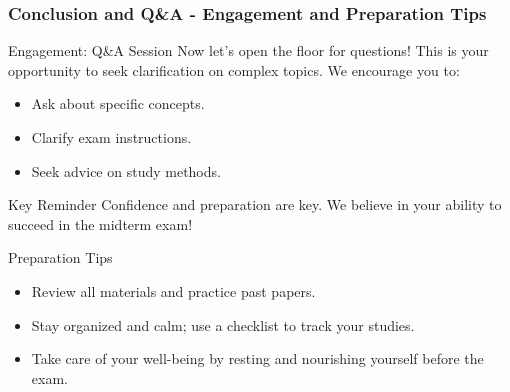 \documentclass{beamer}
\begin{document}
\begin{frame}[fragile]
    \frametitle{Conclusion and Q\&A - Engagement and Preparation Tips}
    \begin{block}{Engagement: Q\&A Session}
        Now let’s open the floor for questions! This is your opportunity to seek clarification on complex topics. We encourage you to:
        \begin{itemize}
            \item Ask about specific concepts.
            \item Clarify exam instructions.
            \item Seek advice on study methods.
        \end{itemize}
    \end{block}
    
    \begin{block}{Key Reminder}
        Confidence and preparation are key. We believe in your ability to succeed in the midterm exam!
    \end{block}
    
    \begin{block}{Preparation Tips}
        \begin{itemize}
            \item Review all materials and practice past papers.
            \item Stay organized and calm; use a checklist to track your studies.
            \item Take care of your well-being by resting and nourishing yourself before the exam.
        \end{itemize}
    \end{block}
\end{frame}
\end{document}
